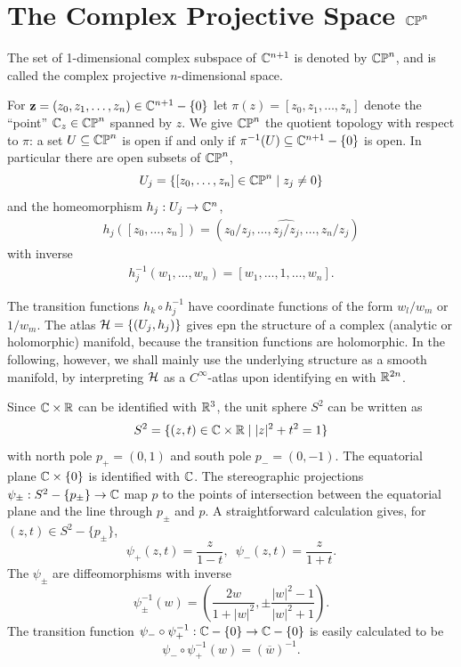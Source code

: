 \chapter{The Complex Projective Space \texorpdfstring{$\mathbb{CP}^n$}{CPn}}
The set of 1-dimensional complex subspace of ${\mathbb{C}}^{n+1}$ is denoted by $\mathbb{CP}^n$, and 
is called the complex projective $n$-dimensional space.

For $\mathbf{z}=(z_0, z_1, \ldots, z_n)\in{\ensuremath{\mathbb{C}}}^{n+1}-\{0\}$ let $\pi(z)=[z_0,z_1, \ldots, z_n]$ denote the ``point''
${\mathbb{C}}_z\in\mathbb{CP}^n$ spanned by $z$. We give $\mathbb{CP}^n$ the quotient topology with respect to $\pi$: a set $U\subseteq \mathbb{CP}^n$
is open if and only if $\pi^{-1}(U)\subseteq{\ensuremath{\mathbb{C}}}^{n+1}-\{0\}$ is open. In particular there are open subsets of $\mathbb{CP}^n$,
\[
  U_j = \{[z_0, \ldots, z_n]\in\mathbb{CP}^n\mid z_j\neq 0\}
\]
and the homeomorphism $h_j:U_j\to{\ensuremath{\mathbb{C}}}^n$,
\begin{align}\label{eq:14-1}
  h_j([z_0, \ldots, z_n]) = \left(z_0/z_j, \ldots, \widehat{z_j/z_j}, \ldots, z_n/z_j\right)
\end{align}
with inverse
\begin{align}\label{eq:14-2}
  h_j^{-1}(w_1, \ldots, w_n) = [w_1, \ldots, 1,\ldots, w_n].
\end{align}

The transition functions $h_k\circ h_j^{-1}$ have coordinate functions of the form $w_l/w_m$ or
$1/w_m$. The atlas $\mathcal{H} = \{(U_j , h_j)\}$ gives epn the structure of a complex (analytic
or holomorphic) manifold, because the transition functions are holomorphic. In
the following, however, we shall mainly use the underlying structure as a smooth
manifold, by interpreting $\mathcal{H}$ as a $C^\infty$-atlas upon identifying en with ${\mathbb{R}}^{2n}$.

\begin{example}\label{example:14-1}
  Since ${\mathbb{C}}\times{\ensuremath{\mathbb{R}}}$ can be identified with ${\mathbb{R}}^3$, the unit sphere $S^2$ can be written as
  \[
    S^2 = \{(z, t)\in{\ensuremath{\mathbb{C}}}\times{\ensuremath{\mathbb{R}}}\mid |z|^2 + t^2 = 1\}
  \]
  with north pole $p_+ = (0,1)$ and south pole $p_{-} = (0, -1)$. The equatorial plane
  ${\mathbb{C}}\times \{0\}$ is identified with ${\mathbb{C}}$. The stereographic projections $\psi_{\pm}:S^2-\{p_{\pm}\}\to{\ensuremath{\mathbb{C}}}$
  map $p$ to the points of intersection between the equatorial plane and the line
  through $p_{\pm}$ and $p$. A straightforward calculation gives, for $(z, t)\in S^2-\{p_{\pm}\}$,
  \[
    \psi_+(z, t) = \frac{z }{1-t},\enspace \psi_{-}(z, t) = \frac{z}{1+t}.
  \]
  The $\psi_{\pm}$ are diffeomorphisms with inverse 
  \[
    \psi_{\pm}^{-1}(w) = \left(\frac{2w}{1+|w|^2}, \pm\frac{|w|^2-1}{|w|^2+1}\right).
  \]
  The transition function $\psi_{-}\circ\psi_{+}^{-1}:{\mathbb{C}}-\{0\}\to{\ensuremath{\mathbb{C}}}-\{0\}$ is easily calculated to be 
  \[
    \psi_{-}\circ\psi_{+}^{-1}(w) = (\overline{w})^{-1}.
  \]
\end{example}

